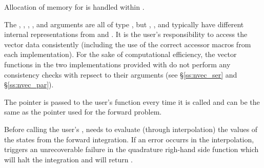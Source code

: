 {
  Allocation of memory for  is handled within {\idas}.

  The , , , , and  arguments are all 
  of type , but , , and  typically have 
  different internal representations from  and . It is the user's 
  responsibility to access the vector data consistently (including the use of the 
  correct accessor macros from each {\nvector} implementation). For the sake of 
  computational efficiency, the vector functions in the two {\nvector} implementations 
  provided with {\idas} do not perform any consistency checks with repsect to their 
   arguments (see \S\ref{ss:nvec_ser} and \S\ref{ss:nvec_par}).

  The  pointer is passed to the user's  function every time 
  it is called and can be the same as the  pointer used for the forward problem.

  {\warn}Before calling the user's , {\idaa} needs to evaluate
  (through interpolation) the values of the states from the forward integration. 
  If an error occurrs in the interpolation, {\idaa} triggers an unrecoverable
  failure in the quadrature righ-hand side function which will halt the integration and
   will return .
}

